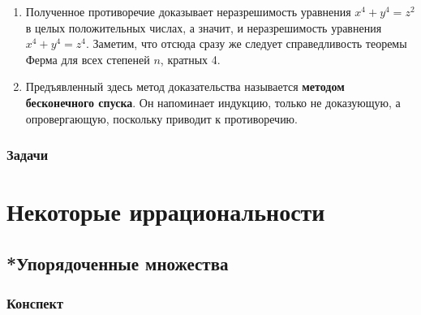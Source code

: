 \begin{enumerate}
\item Полученное противоречие доказывает неразрешимость уравнения $x^4+y^4=z^2$ в целых положительных числах, а значит, и неразрешимость уравнения $x^4+y^4=z^4$. Заметим, что отсюда сразу же следует справедливость теоремы Ферма для всех степеней $n$, кратных 4.

\item Предъявленный здесь метод доказательства называется \textbf{методом бесконечного спуска}. Он напоминает индукцию, только не доказующую, а опровергающую, поскольку приводит к противоречию.

\end{enumerate}



\subsection*{Задачи}





\chapter{Некоторые иррациональности}


\section{*Упорядоченные множества}\label{Ordering}

\subsection*{Конспект}

